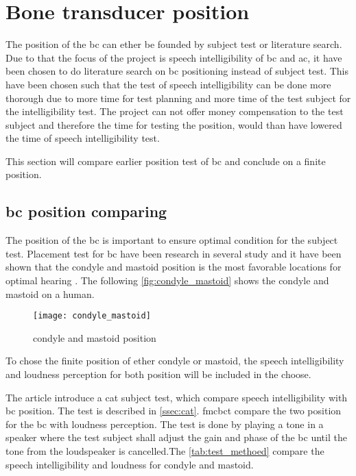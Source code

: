\section{Bone transducer position}

The position of the \gls{bc} can ether be founded by subject test or literature search. Due to that the focus of the project is speech intelligibility of \gls{bc} and \gls{ac}, it have been chosen to do literature search on \gls{bc} positioning instead of subject test. This have been chosen such that the test of speech intelligibility can be done more thorough due to more time for test planning and more time of the test subject for the intelligibility test. The project can not offer money compensation to the test subject and therefore the time for testing the position, would than have lowered the time of speech intelligibility test. 

This section will compare earlier position test of \gls{bc} and conclude on a finite position.

\subsection{\gls{bc} position comparing}
The position of the \gls{bc} is important to ensure optimal condition for the subject test. Placement test for \gls{bc} have been research in several study and it have been shown that the condyle and mastoid position is the most favorable locations for optimal hearing \citep{cat_test}. The following \autoref{fig:condyle_mastoid} shows the  condyle and mastoid on a human.

\begin{figure}[H]
	\centering
		\texttt{[image: condyle\_mastoid]}
		\caption{condyle and mastoid position \citep{cat_test}}
		\label{fig:condyle_mastoid}
\end{figure}

To chose the finite position of ether condyle or mastoid, the speech intelligibility and loudness perception for both position will be included in the choose. 


The article \citep{cat_test} introduce a \gls{cat} subject test, which compare  speech intelligibility with \gls{bc} position. The test is described in \autoref{ssec:cat}. \gls{fmcbct} \citep{freefield_method} compare the two position for the \gls{bc} with loudness perception. The test is done by playing a tone in a speaker where the test subject shall adjust the gain and phase of the \gls{bc} until the tone from the loudspeaker is cancelled.The \autoref{tab:test_methoed} compare the speech intelligibility and loudness for condyle and mastoid.


